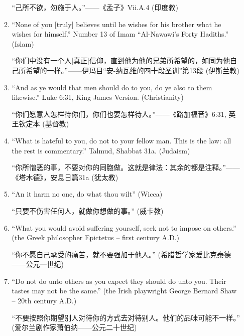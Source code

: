 \begin{enumerate}
\begin{enumerate}
  “己所不欲，勿施于人。”——《孟子》Vii.A.4 (印度教)
  \item ``None of you [truly] believes until he wishes for his brother what he wishes for himself.'' Number 13 of Imam ``Al-Nawawi's Forty Hadiths.'' (Islam)
  
  “你们中没有一个人[真正]信仰，直到他为他的兄弟所希望的，如同为他自己所希望的一样。”——伊玛目“安-纳瓦维的四十段圣训”第13段 (伊斯兰教)
  \item ``And as ye would that men should do to you, do ye also to them likewise.'' Luke 6:31, King James Version.
  (Christianity)
  
  “你们愿意人怎样待你们，你们也要怎样待人。”——《路加福音》6:31, 英王钦定本 (基督教)
  \item ``What is hateful to you, do not to your fellow man.
  This is the law: all the rest is commentary.'' Talmud, Shabbat 31a.
  (Judaism)
  
  “你所憎恶的事，不要对你的同胞做。这就是律法：其余的都是注释。”——《塔木德》，安息日篇31a (犹太教)
  \item ``An it harm no one, do what thou wilt'' (Wicca)
  
  “只要不伤害任何人，就做你想做的事。” (威卡教)
  \item ``What you would avoid suffering yourself, seek not to impose on others.'' (the Greek philosopher Epictetus -- first century A.D.)
  
  “你不愿自己承受的痛苦，就不要强加于他人。” (希腊哲学家爱比克泰德——公元一世纪)
  \item ``Do not do unto others as you expect they should do unto you.
  Their tastes may not be the same.'' (the Irish playwright George Bernard Shaw -- 20th century A.D.)
  
  “不要按照你期望别人对待你的方式去对待别人。他们的品味可能不一样。” (爱尔兰剧作家萧伯纳——公元二十世纪)
  \end{enumerate}
  
  \wbvfill
  
\end{enumerate}
